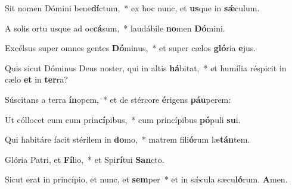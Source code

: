 \item Sit nomen Dómini bene\textbf{dí}ctum,~* ex hoc nunc, et \textbf{us}que in \textbf{sǽ}culum.
\item A solis ortu usque ad oc\textbf{cá}sum,~* laudábile \textbf{no}men \textbf{Dó}mini.
\item Excélsus super omnes gentes \textbf{Dó}minus,~* et super cælos \textbf{gló}ria \textbf{e}jus.
\item Quis sicut Dóminus Deus noster, qui in altis \textbf{há}bitat,~* et humília réspicit in cælo \textbf{et} in \textbf{ter}ra?
\item Súscitans a terra \textbf{ín}opem,~* et de stércore \textbf{é}rigens \textbf{páu}perem:
\item Ut cóllocet eum cum prin\textbf{cí}pibus,~* cum princípibus \textbf{pó}puli \textbf{su}i.
\item Qui habitáre facit stérilem in \textbf{do}mo,~* matrem fili\textbf{ó}rum læ\textbf{tán}tem.
\item Glória Patri, et \textbf{Fí}lio,~* et Spi\textbf{rí}tui \textbf{San}cto.
\item Sicut erat in princípio, et nunc, et \textbf{sem}per~* et in sǽcula sæcu\textbf{ló}rum. \textbf{A}men.
